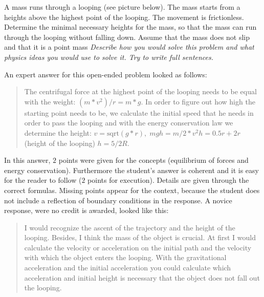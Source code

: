\documentclass[]{interact}
\begin{document}
A mass runs through a looping (see picture below). The mass starts from a heights above the highest point of the looping. The movement is frictionless. Determine the minimal necessary heights for the mass, so that the mass can run through the looping without falling down. Assume that the mass does not slip and that it is a point mass \textit{Describe how you would solve this problem and what physics ideas you would use to solve it. Try to write full sentences.}

\begin{center}

\end{center}

An expert answer for this open-ended problem looked as follows: 
\begin{quote}
The centrifugal force at the highest point of the looping needs to be equal with the weight: $(m*v^2)/r=m*g$. In order to figure out how high the starting point needs to be, we calculate the initial speed that he needs in order to pass the looping and with the energy conservation law we determine the height: $v=\text{sqrt}(g*r), \; mgh=m/2*v^2 h=0.5r+2r$ (height of the looping) $h=5/2R$.

\end{quote}

In this answer, $2$ points were given for the concepts (equilibrium of forces and energy conservation). Furthermore the student's answer is coherent and it is easy for the reader to follow ($2$ points for execution). Details are given through the correct formulas. Missing points appear for the context, because the student does not include a reflection of boundary conditions in the response. A novice response, were no credit is awarded, looked like this:
\begin{quote}
I would recognize the ascent of the trajectory and the height of the looping. Besides, I think the mass of the object is crucial. At first I would calculate the velocity or acceleration on the initial path and the velocity with which the object enters the looping. With the gravitational acceleration and the initial acceleration you could calculate which acceleration and initial height is necessary that the object does not fall out the looping.

\end{quote}
\end{document}
